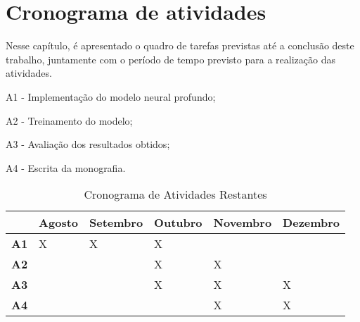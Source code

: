 \chapter{Cronograma de atividades}\label{cronograma}

Nesse capítulo, é apresentado o quadro de tarefas previstas até a conclusão deste
trabalho, juntamente com o período de tempo previsto para a realização das atividades.

A1 - Implementação do modelo neural profundo;

A2 - Treinamento do modelo;

A3 - Avaliação dos resultados obtidos;

A4 - Escrita da monografia.

\begin{table}[!htb]
\footnotesize
\centering
\caption{Cronograma de Atividades Restantes}
\label{tab:cronogramaativs}
\begin{tabular}{P{1cm}P{2cm}P{2cm}P{2cm}P{2cm}P{2cm}}
  \toprule
  & \textbf{Agosto} & \textbf{Setembro}  & \textbf{Outubro}  & \textbf{Novembro} & \textbf{Dezembro}  \\
  \midrule
  \textbf{A1} & X & X & X &   &   \\
  \textbf{A2} &   &   & X & X &   \\
  \textbf{A3} &   &   & X & X & X \\
  \textbf{A4} &   &   &   & X & X \\
  \bottomrule
\end{tabular}
\end{table}

